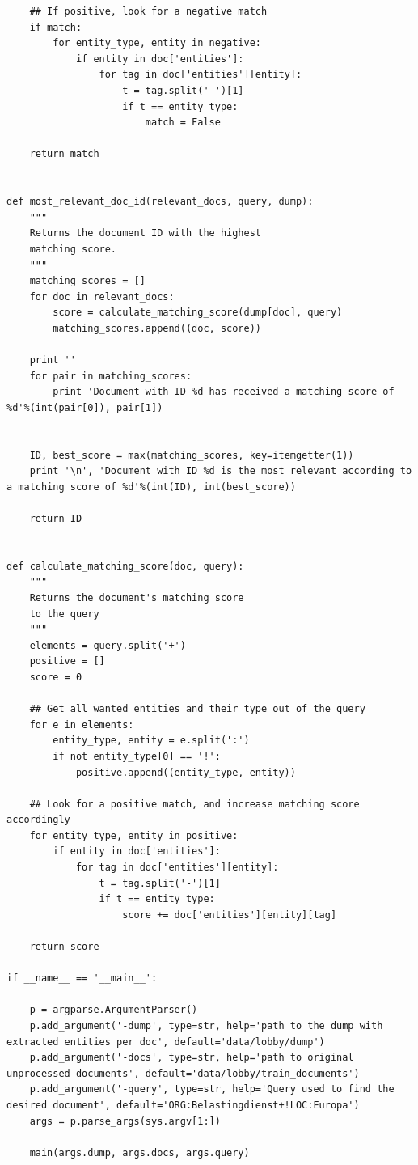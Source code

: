 \begin{lstlisting}
    ## If positive, look for a negative match
    if match:
        for entity_type, entity in negative:
            if entity in doc['entities']:
                for tag in doc['entities'][entity]:
                    t = tag.split('-')[1]
                    if t == entity_type:
                        match = False

    return match


def most_relevant_doc_id(relevant_docs, query, dump):
    """
    Returns the document ID with the highest
    matching score.
    """
    matching_scores = []
    for doc in relevant_docs:
        score = calculate_matching_score(dump[doc], query)
        matching_scores.append((doc, score))

    print ''
    for pair in matching_scores:
        print 'Document with ID %d has received a matching score of %d'%(int(pair[0]), pair[1])


    ID, best_score = max(matching_scores, key=itemgetter(1))
    print '\n', 'Document with ID %d is the most relevant according to a matching score of %d'%(int(ID), int(best_score)) 

    return ID
        

def calculate_matching_score(doc, query):
    """
    Returns the document's matching score
    to the query
    """ 
    elements = query.split('+')
    positive = []
    score = 0

    ## Get all wanted entities and their type out of the query
    for e in elements:
        entity_type, entity = e.split(':')
        if not entity_type[0] == '!':
            positive.append((entity_type, entity))

    ## Look for a positive match, and increase matching score accordingly
    for entity_type, entity in positive:
        if entity in doc['entities']:
            for tag in doc['entities'][entity]:
                t = tag.split('-')[1]
                if t == entity_type:
                    score += doc['entities'][entity][tag]

    return score

if __name__ == '__main__':

    p = argparse.ArgumentParser()
    p.add_argument('-dump', type=str, help='path to the dump with extracted entities per doc', default='data/lobby/dump')
    p.add_argument('-docs', type=str, help='path to original unprocessed documents', default='data/lobby/train_documents')
    p.add_argument('-query', type=str, help='Query used to find the desired document', default='ORG:Belastingdienst+!LOC:Europa')
    args = p.parse_args(sys.argv[1:])

    main(args.dump, args.docs, args.query)



 
\end{lstlisting}